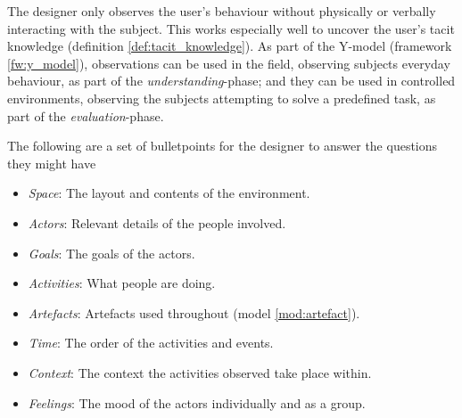 \begin{method}[Observation] \label{meth:observation} 
  The designer only observes the user's behaviour without physically or verbally interacting with the subject. This works especially well to uncover the user's tacit knowledge (definition \ref{def:tacit_knowledge}). As part of the Y-model (framework \ref{fw:y_model}), observations can be used in the field, observing subjects everyday behaviour, as part of the \emph{understanding}-phase; and they can be used in controlled environments, observing the subjects attempting to solve a predefined task, as part of the \emph{evaluation}-phase. \cite[p.247-248]{rogers}

  The following are a set of bulletpoints for the designer to answer the questions they might have \cite[p.249]{rogers}
  \begin{itemize}
    \item \emph{Space}: The layout and contents of the environment.
    \item \emph{Actors}: Relevant details of the people involved.
    \item \emph{Goals}: The goals of the actors.
    \item \emph{Activities}: What people are doing.
    \item \emph{Artefacts}: Artefacts used throughout (model \ref{mod:artefact}).
    \item \emph{Time}: The order of the activities and events.
    \item \emph{Context}: The context the activities observed take place within.
    \item \emph{Feelings}: The mood of the actors individually and as a group.
  \end{itemize}
\end{method}
